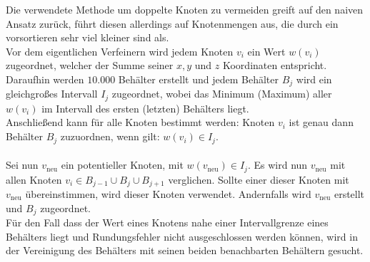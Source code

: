 \documentclass[
	a4paper,			%
	11pt,				%
	headsepline,		%
	bibtotoc,			%
	BCOR18mm,      		%
	DIV14,				%
	headings=normal,
	numbers=noenddot,
]{scrbook}
\theoremstyle{mythmstyle}
\theoremstyle{other}
\begin{document}
	
	Die verwendete Methode um doppelte Knoten zu vermeiden greift auf den naiven Ansatz zurück, führt diesen
	allerdings auf Knotenmengen aus, die durch ein vorsortieren sehr viel kleiner sind als.\\	
	Vor dem eigentlichen Verfeinern wird jedem Knoten $v_i$ ein Wert $w(v_i)$ zugeordnet, welcher der Summe seiner
	 $x,y$ und $z$
	Koordinaten entspricht. Daraufhin werden $10.000$ Behälter erstellt und jedem Behälter $B_j$ wird ein 
	gleichgroßes Intervall $I_j$
	zugeordnet, wobei das Minimum (Maximum) aller $w(v_i)$ im Intervall des ersten (letzten) Behälters liegt.\\
	Anschließend kann für alle Knoten bestimmt werden:
	Knoten $v_i$ ist genau dann Behälter $B_j$ zuzuordnen, wenn gilt: $w(v_i) \in I_j$.\\\\
	 Sei nun $v_{\text{neu}}$
	ein potentieller Knoten, mit $w(v_{\text{neu}}) \in I_j$. Es wird nun $v_{\text{neu}} $ mit allen Knoten
	 $v_i \in B_{j-1}\cup B_{j} \cup B_{j+1}$ verglichen. Sollte einer dieser Knoten mit $v_{\text{neu}}$
	 übereinstimmen, wird dieser Knoten verwendet. Andernfalls wird $v_{\text{neu}}$ erstellt und $B_j$
	  zugeordnet.\\	 
	 Für den Fall dass der Wert eines Knotens nahe einer Intervallgrenze eines Behälters liegt und 
	 Rundungsfehler nicht
	 ausgeschlossen werden können, wird  in der Vereinigung des Behälters mit seinen beiden benachbarten
	 Behältern gesucht.\\

	
	
	
	
	
	
	
	
	
	
	
	
	
	
	
	

	
	
	
	
	\printglossary[type=\acronymtype,title=List of Notation and Abbreviations]
	
	
	
\end{document}
